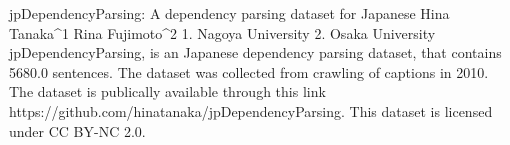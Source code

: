
jpDependencyParsing: A dependency parsing dataset for Japanese
Hina Tanaka^1 Rina Fujimoto^2
1. Nagoya University 2. Osaka University
jpDependencyParsing, is an Japanese dependency parsing dataset, that contains 5680.0 sentences.
The dataset was collected from crawling of captions in 2010. 
The dataset is publically available through this link https://github.com/hinatanaka/jpDependencyParsing. This dataset is licensed under CC BY-NC 2.0.

